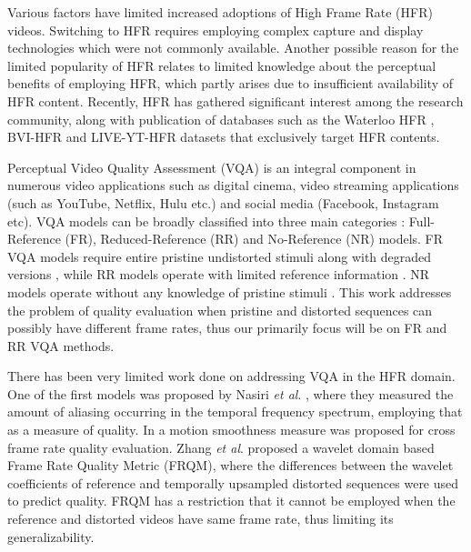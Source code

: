 \documentclass[journal]{IEEEtran}
\newcommand{\etal}{\textit{et al}. }
\begin{document}
Various factors have limited increased adoptions of High Frame Rate (HFR) videos. Switching to HFR requires employing complex capture and display technologies which were not commonly available. Another possible reason for the limited popularity of HFR relates to limited knowledge about the perceptual benefits of employing HFR, which partly arises due to insufficient availability of HFR content. Recently, HFR has gathered significant interest among the research community, along with publication of databases such as the Waterloo HFR \cite{nasiri2015perceptual}, BVI-HFR \cite{mackin2018study} and LIVE-YT-HFR \cite{pavan2020liveythfr} datasets that exclusively target HFR contents. 



Perceptual Video Quality Assessment (VQA) is an integral component in numerous video applications such as digital cinema, video streaming applications (such as YouTube, Netflix, Hulu etc.) and social media (Facebook, Instagram etc). VQA models can be broadly classified into three main categories \cite{chikkerur2011objective}: Full-Reference (FR), Reduced-Reference (RR) and No-Reference (NR) models. FR VQA models require entire pristine undistorted stimuli along with degraded versions \cite{wang2004image,wang2003multiscale,sheikh2006image,zhang2011fsim,seshadrinathan2009motion,vu2011spatiotemporal,manasa2016optical}, while RR models operate with limited reference information \cite{wang2005reduced,li2009reduced,soundararajan2012rred,soundararajan2012video,bampis2017speed}. NR models operate without any knowledge of pristine stimuli \cite{mittal2012no,mittal2013making,saad2014blind,li2016spatiotemporal}. This work addresses the problem of quality evaluation when pristine and distorted sequences can possibly have different frame rates, thus our primarily focus will be on FR and RR VQA methods. 



There has been very limited work done on addressing VQA in the HFR domain. One of the first models was proposed by Nasiri \etal \cite{nasiri2017perceptual}, where they measured the amount of aliasing occurring in the temporal frequency spectrum, employing that as a measure of quality. In \cite{nasiri2018temporal} a motion smoothness measure was proposed for cross frame rate quality evaluation. Zhang \etal \cite{zhang2017frame} proposed a wavelet domain based Frame Rate Quality Metric (FRQM), where the differences between the wavelet coefficients of reference and temporally upsampled distorted sequences were used to predict quality. FRQM has a restriction that it cannot be employed when the reference and distorted videos have same frame rate, thus limiting its generalizability. 
\end{document}
